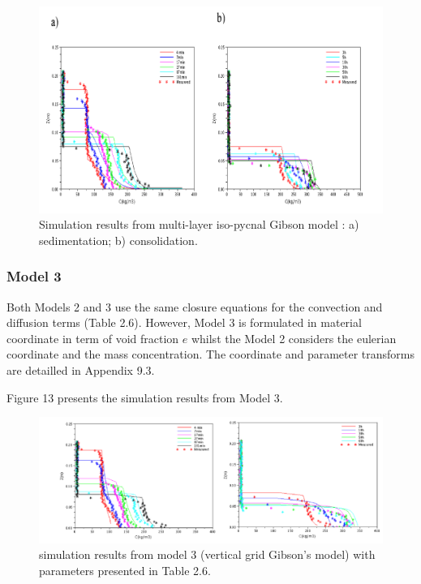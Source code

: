 \begin{figure}[H]
\begin{center}
\includegraphics[scale=0.1,angle=0]{graphics/fig12.png}
\caption{Simulation results from multi-layer iso-pycnal Gibson model : a)
sedimentation; b) consolidation.}\label{fig:12}
\end{center}
\end{figure}

\subsubsection*{Model 3}

Both Models 2 and 3 use the same closure equations for the convection and
diffusion terms (Table 2.6). However, Model 3 is formulated in material
coordinate in term of void fraction $e$ whilst the Model 2 considers the
eulerian coordinate and the mass concentration. The coordinate and parameter
transforms are detailled in Appendix 9.3.

Figure 13 presents the simulation results from Model 3.

\begin{figure}[H]
\begin{center}
\includegraphics[scale=0.25,angle=0]{graphics/fig13.png}
\caption{simulation results from model 3 (vertical grid Gibson's model) with
parameters presented in Table 2.6.}\label{fig:13}
\end{center}
\end{figure}


